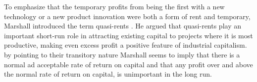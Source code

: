To emphasize that the temporary profits from being the first with a new technology or a new product innovation were both a form of rent and temporary, Marshall introduced the term \glspl{quasi-rent} \cite{johnsonRentModernEconomic1902}.  He argued that  quasi-rents play an important short-run role in attracting existing capital to projects where it is most productive, making even excess profit a positive feature of industrial capitalism. by pointing to their transitory nature Marshall seems to imply that there is a normal ad acceptable rate of return on capital and that any  profit over and above the normal rate of return on capital, is unimportant in the long run.

